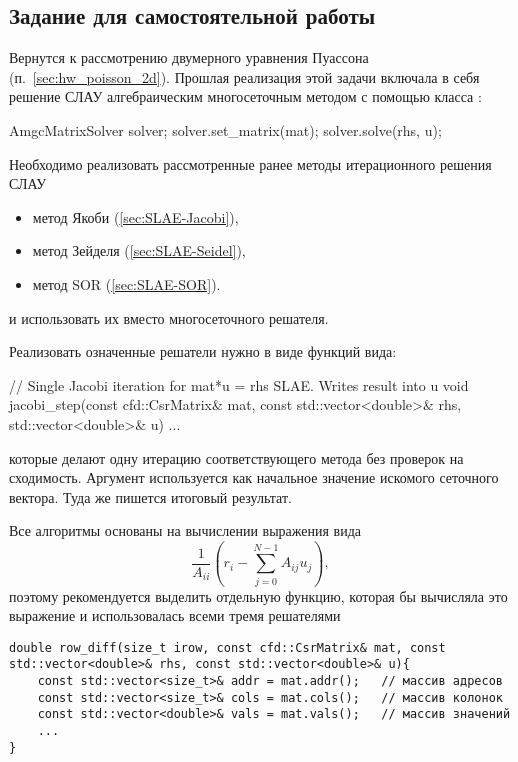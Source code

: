 \subsection{Задание для самостоятельной работы}

Вернутся к рассмотрению двумерного уравнения Пуассона (п.~\ref{sec:hw_poisson_2d}).
Прошлая реализация этой задачи
включала в себя решение СЛАУ алгебраическим многосеточным методом
с помощью класса :
\begin{cppcode}
	AmgcMatrixSolver solver;
	solver.set_matrix(mat);
	solver.solve(rhs, u);
\end{cppcode}

Необходимо реализовать рассмотренные ранее методы
итерационного решения СЛАУ

\begin{itemize}
\item метод Якоби (\ref{sec:SLAE-Jacobi}),
\item метод Зейделя (\ref{sec:SLAE-Seidel}),
\item метод SOR (\ref{sec:SLAE-SOR}).
\end{itemize}
и использовать их вместо многосеточного решателя.

Реализовать означенные решатели нужно в виде функций вида:
\begin{cppcode}
// Single Jacobi iteration for mat*u = rhs SLAE. Writes result into u
void jacobi_step(const cfd::CsrMatrix& mat, const std::vector<double>& rhs, std::vector<double>& u){
    ...
}
\end{cppcode}
которые делают одну итерацию соответствующего метода без проверок на сходимость.
Аргумент  используется как начальное значение искомого сеточного вектора. Туда же пишется 
итоговый результат.

Все алгоритмы основаны на вычислении выражения вида
\begin{equation*}
   \frac{1}{A_{ii}}\left(r_i - \sum_{j=0}^{N-1} A_{ij}{u_j}\right),
\end{equation*}
поэтому рекомендуется выделить отдельную функцию, которая бы вычисляла это выражение
и использовалась всеми тремя решателями
\begin{verbatim}
double row_diff(size_t irow, const cfd::CsrMatrix& mat, const std::vector<double>& rhs, const std::vector<double>& u){
	const std::vector<size_t>& addr = mat.addr();   // массив адресов
	const std::vector<size_t>& cols = mat.cols();   // массив колонок
	const std::vector<double>& vals = mat.vals();   // массив значений
    ...
}
\end{verbatim}

